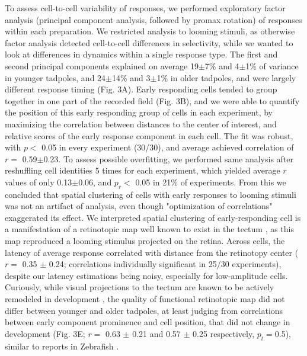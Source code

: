 \documentclass{article}
\begin{document}
To assess cell-to-cell variability of responses, we performed exploratory factor analysis (principal component analysis, followed by promax rotation) of responses within each preparation. We restricted analysis to looming stimuli, as otherwise factor analysis detected cell-to-cell differences in selectivity, while we wanted to look at differences in dynamics within a single response type. The first and second principal components explained on average 19$\pm$7\% and 4$\pm$1\% of variance in younger tadpoles, and 24$\pm$14\% and 3$\pm$1\% in older tadpoles, and were largely different response timing (Fig. 3A). Early responding cells tended to group together in one part of the recorded field (Fig. 3B), and we were able to quantify the position of this early responding group of cells in each experiment, by maximizing the correlation between distances to the center of interest, and relative scores of the early response component in each cell. The fit was robust, with $p<$ 0.05 in every experiment (30/30), and average achieved correlation of $r=$ 0.59$\pm$0.23. To assess possible overfitting, we performed same analysis after reshuffling cell identities 5 times for each experiment, which yielded average $r$ values of only 0.13$\pm$0.06, and $p_r<$ 0.05 in 21\% of experiments. From this we concluded that spatial clustering of cells with early responses to looming stimuli was not an artifact of analysis, even though "optimization of correlations" exaggerated its effect. We interpreted spatial clustering of early-responding cell is a manifestation of a retinotopic map well known to exist in the tectum \citep{ruthazer2004map}, as this map reproduced a looming stimulus projected on the retina. Across cells, the latency of average response correlated with distance from the retinotopy center ($r=$ 0.35 $\pm$ 0.24; correlations individually significant in 25/30 experiments), despite our latency estimations being noisy, especially for low-amplitude cells. Curiously, while visual projections to the tectum are known to be actively remodeled in development \citep{sakaguchi1985refinement,ruthazer2004map,munz2014hebbian}, the quality of functional retinotopic map did not differ between younger and older tadpoles, at least judging from correlations between early component prominence and cell position, that did not change in development (Fig. 3E; $r=$ 0.63 $\pm$ 0.21 and 0.57 $\pm$ 0.25 respectively, $p_t= $0.5), similar to reports in Zebrafish \citep{avitan2016limitations}.
\end{document}
